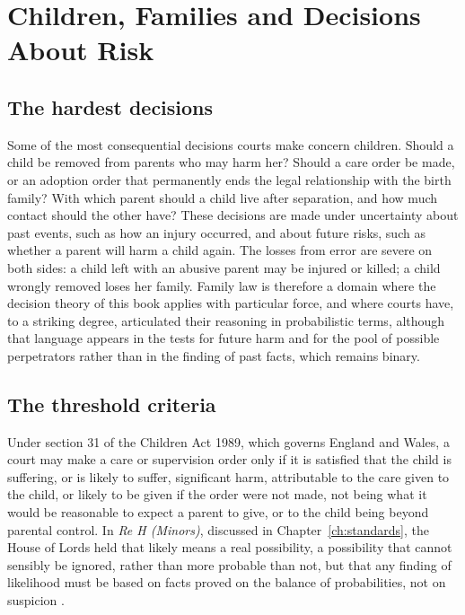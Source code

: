 \chapter{Children, Families and Decisions About Risk}
\label{ch:family}

\section{The hardest decisions}

Some of the most consequential decisions courts make concern children. Should a child be removed from parents who may harm her? Should a care order be made, or an adoption order that permanently ends the legal relationship with the birth family? With which parent should a child live after separation, and how much contact should the other have? These decisions are made under uncertainty about past events, such as how an injury occurred, and about future risks, such as whether a parent will harm a child again. The losses from error are severe on both sides: a child left with an abusive parent may be injured or killed; a child wrongly removed loses her family. Family law is therefore a domain where the decision theory of this book applies with particular force, and where courts have, to a striking degree, articulated their reasoning in probabilistic terms, although that language appears in the tests for future harm and for the pool of possible perpetrators rather than in the finding of past facts, which remains binary.

\section{The threshold criteria}

Under section 31 of the Children Act 1989, which governs England and Wales, a court may make a care or supervision order only if it is satisfied that the child is suffering, or is likely to suffer, significant harm, attributable to the care given to the child, or likely to be given if the order were not made, not being what it would be reasonable to expect a parent to give, or to the child being beyond parental control. In \emph{Re H (Minors)}, discussed in Chapter~\ref{ch:standards}, the House of Lords held that likely means a real possibility, a possibility that cannot sensibly be ignored, rather than more probable than not, but that any finding of likelihood must be based on facts proved on the balance of probabilities, not on suspicion \citep{reh1996}.

